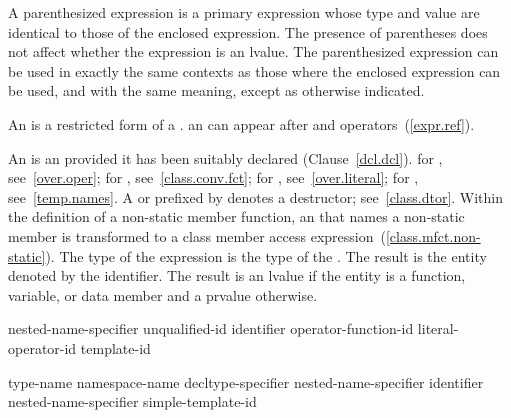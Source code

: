 \pnum
{}%
A parenthesized expression is a primary expression whose type and value
are identical to those of the enclosed expression. The presence of
parentheses does not affect whether the expression is an lvalue. The
parenthesized expression can be used in exactly the same contexts as
those where the enclosed expression can be used, and with the same
meaning, except as otherwise indicated.

\pnum
{}%
%
An  is a restricted form of a
.
\enternote 
an  can appear after  and \tcode{->}
operators~(\ref{expr.ref}).
\exitnote 

\pnum
{}%
An  is an  provided it has
been suitably declared (Clause~\ref{dcl.dcl}).
\enternote 
for , see~\ref{over.oper}; for
, see~\ref{class.conv.fct}; for
, see~\ref{over.literal}; for
, see~\ref{temp.names}. A 
or 
prefixed by \tcode{\tilde} denotes a destructor; see~\ref{class.dtor}.
Within the definition of a non-static member function, an
 that names a non-static member is transformed to a
class member access expression~(\ref{class.mfct.non-static}).
\exitnote 
The type of the expression is the type of the . The
result is the entity denoted by the identifier. The result is an lvalue
if the entity is a function, variable, or data member and a prvalue otherwise.
\clearpage

%
%
%
\begin{bnf}
\br
    nested-name-specifier \opt unqualified-id\br
    \terminal{::} identifier\br
    \terminal{::} operator-function-id\br
    \terminal{::} literal-operator-id\br
    \terminal{::} template-id
\end{bnf}

%
%
%
\begin{bnf}
\br
    \terminal{::}\opt type-name \terminal{::}\br
    \terminal{::}\opt namespace-name \terminal{::}\br
    decltype-specifier \terminal{::}\br
    nested-name-specifier identifier \terminal{::}\br
    nested-name-specifier \opt simple-template-id \terminal{::}
\end{bnf}

